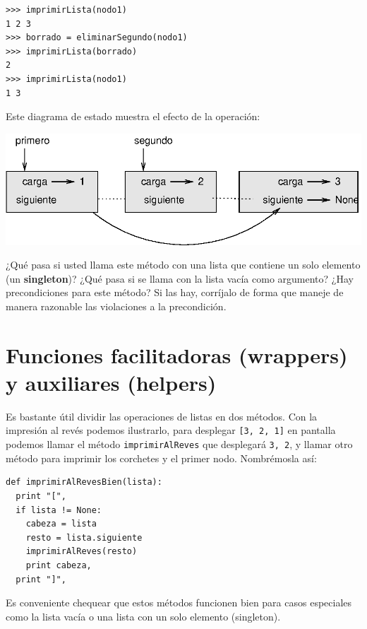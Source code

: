 \beforeverb
\begin{verbatim}
>>> imprimirLista(nodo1)
1 2 3
>>> borrado = eliminarSegundo(nodo1)
>>> imprimirLista(borrado)
2
>>> imprimirLista(nodo1)
1 3
\end{verbatim}
\afterverb
%
Este diagrama de estado muestra el efecto de la operación:

\beforefig
\centerline{\includegraphics{illustrations/link5.eps}}
\afterfig

¿Qué pasa si usted llama este método con una lista que contiene un solo
elemento (un {\bf singleton})?  ¿Qué pasa si se llama con la lista vacía 
como argumento? ¿Hay precondiciones para este método? Si las hay, corríjalo
de forma que maneje de manera razonable las violaciones a la precondición.



\section{Funciones facilitadoras (wrappers) y auxiliares (helpers)}

Es bastante útil dividir las operaciones de listas en dos métodos.
Con la impresión al revés podemos ilustrarlo, para desplegar  \texttt{[3, 2, 1]} 
en pantalla podemos llamar el método \texttt{imprimirAlReves} que 
desplegará \texttt{3, 2}, y llamar otro método para imprimir los
corchetes y el primer nodo. Nombrémosla así:

\beforeverb
\begin{verbatim}
def imprimirAlRevesBien(lista):
  print "[",
  if lista != None:
    cabeza = lista
    resto = lista.siguiente
    imprimirAlReves(resto)
    print cabeza,
  print "]",
\end{verbatim}
\afterverb
%
Es conveniente chequear que estos métodos funcionen bien para casos
especiales como la lista vacía o una lista con un solo elemento (singleton).

